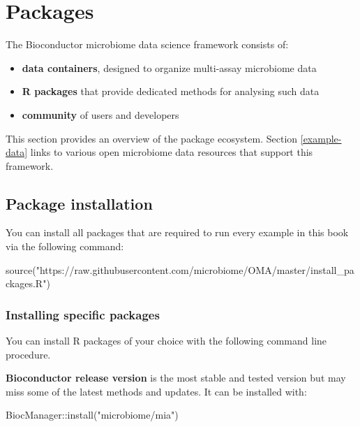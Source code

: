 \documentclass[
]{book}
\newenvironment{Shaded}{\begin{snugshade}}{\end{snugshade}}
\newcommand{\FunctionTok}[1]{\textcolor[rgb]{0.00,0.00,0.00}{#1}}
\newcommand{\NormalTok}[1]{#1}
\newcommand{\SpecialCharTok}[1]{\textcolor[rgb]{0.00,0.00,0.00}{#1}}
\newcommand{\StringTok}[1]{\textcolor[rgb]{0.31,0.60,0.02}{#1}}
\providecommand{\tightlist}{%
  \setlength{\itemsep}{0pt}\setlength{\parskip}{0pt}}
\begin{document}
\hypertarget{packages}{%
\chapter{Packages}\label{packages}}

The Bioconductor microbiome data science framework consists of:

\begin{itemize}
\tightlist
\item
  \textbf{data containers}, designed to organize multi-assay microbiome data
\item
  \textbf{R packages} that provide dedicated methods for analysing such data
\item
  \textbf{community} of users and developers
\end{itemize}

This section provides an overview of the package ecosystem. Section
\ref{example-data} links to various open microbiome data resources
that support this framework.

\hypertarget{package-installation}{%
\section{Package installation}\label{package-installation}}

You can install all packages that are required to run every example in this book via the following command:

\begin{Shaded}
\begin{Highlighting}[]
\FunctionTok{source}\NormalTok{(}\StringTok{"https://raw.githubusercontent.com/microbiome/OMA/master/install\_packages.R"}\NormalTok{)}
\end{Highlighting}
\end{Shaded}

\hypertarget{packages_specific}{%
\subsection{Installing specific packages}\label{packages_specific}}

You can install R packages of your choice with the following command
line procedure.

\textbf{Bioconductor release version} is the most stable and tested version
but may miss some of the latest methods and updates. It can be
installed with:

\begin{Shaded}
\begin{Highlighting}[]
\NormalTok{BiocManager}\SpecialCharTok{::}\FunctionTok{install}\NormalTok{(}\StringTok{"microbiome/mia"}\NormalTok{)}
\end{Highlighting}
\end{Shaded}
\end{document}
